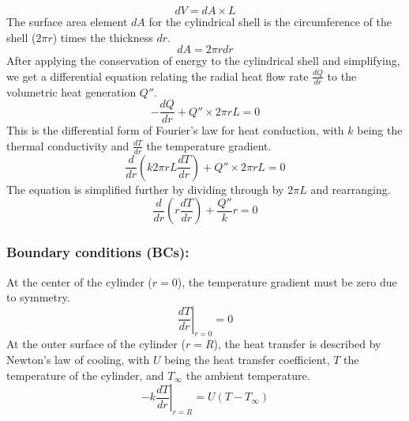 \documentclass{article}
\numberwithin{equation}{section}
\begin{document}
\begin{equation}
dV = dA \times L
\end{equation}
\noindent
The surface area element \( dA \) for the cylindrical shell is the circumference of the shell (\( 2\pi r \)) times the thickness \( dr \).
\begin{equation}
dA = 2\pi r dr
\end{equation}
\noindent
After applying the conservation of energy to the cylindrical shell and simplifying, we get a differential equation relating the radial heat flow rate \( \frac{dQ}{dr} \) to the volumetric heat generation \( Q'' \).
\begin{equation}
-\frac{dQ}{dr} + Q'' \times 2\pi r L = 0
\end{equation}
\noindent
This is the differential form of Fourier’s law for heat conduction, with \( k \) being the thermal conductivity and \( \frac{dT}{dr} \) the temperature gradient.
\begin{equation}
\frac{d}{dr}\left( k 2\pi r L \frac{dT}{dr} \right) + Q'' \times 2\pi r L = 0
\end{equation}
\noindent
The equation is simplified further by dividing through by \( 2\pi L \) and rearranging.
\begin{equation}
\frac{d}{dr}\left( r \frac{dT}{dr} \right) + \frac{Q''}{k} r = 0
\end{equation}

\noindent
\subsubsection*{Boundary conditions (BCs):}
At the center of the cylinder (\( r = 0 \)), the temperature gradient must be zero due to symmetry.
\begin{equation}
\left. \frac{dT}{dr} \right|_{r=0} = 0
\end{equation}
\noindent
At the outer surface of the cylinder (\( r = R \)), the heat transfer is described by Newton’s law of cooling, with \( U \) being the heat transfer coefficient, \( T \) the temperature of the cylinder, and \( T_{\infty} \) the ambient temperature.
\begin{equation}
-k \left. \frac{dT}{dr} \right|_{r=R} = U(T - T_{\infty})
\end{equation}
\end{document}
